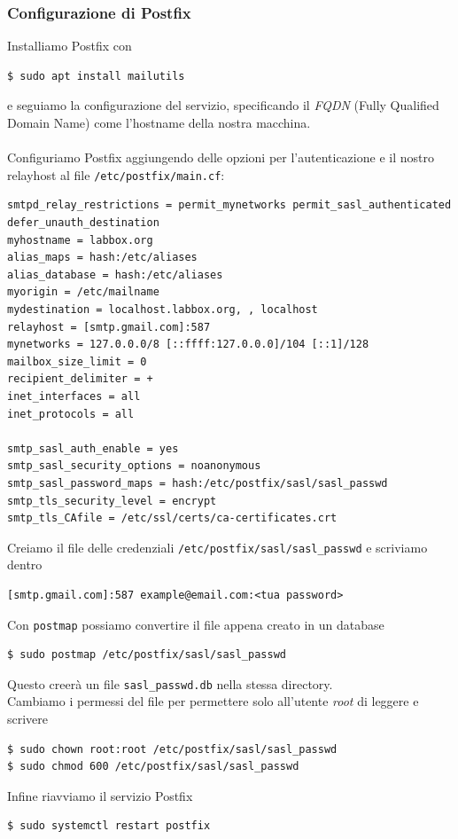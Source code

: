 \documentclass[11pt]{article}
\begin{document}
\subsubsection{Configurazione di Postfix}
Installiamo Postfix con
\begin{verbatim}
$ sudo apt install mailutils
\end{verbatim}
e seguiamo la configurazione del servizio, specificando il \textit{FQDN} (Fully Qualified Domain Name) come l'hostname della nostra macchina.
\\
\\
Configuriamo Postfix aggiungendo delle opzioni per l'autenticazione e il nostro relayhost al file \texttt{/etc/postfix/main.cf}:
\begin{lstlisting}[caption={main.cf}]
smtpd_relay_restrictions = permit_mynetworks permit_sasl_authenticated defer_unauth_destination
myhostname = labbox.org
alias_maps = hash:/etc/aliases
alias_database = hash:/etc/aliases
myorigin = /etc/mailname
mydestination = localhost.labbox.org, , localhost
relayhost = [smtp.gmail.com]:587
mynetworks = 127.0.0.0/8 [::ffff:127.0.0.0]/104 [::1]/128
mailbox_size_limit = 0
recipient_delimiter = +
inet_interfaces = all
inet_protocols = all
    
smtp_sasl_auth_enable = yes
smtp_sasl_security_options = noanonymous
smtp_sasl_password_maps = hash:/etc/postfix/sasl/sasl_passwd
smtp_tls_security_level = encrypt
smtp_tls_CAfile = /etc/ssl/certs/ca-certificates.crt
\end{lstlisting}
Creiamo il file delle credenziali \texttt{/etc/postfix/sasl/sasl\_passwd} e scriviamo dentro
\begin{verbatim}
[smtp.gmail.com]:587 example@email.com:<tua password>
\end{verbatim}
Con \texttt{postmap} possiamo convertire il file appena creato in un database
\begin{verbatim}
$ sudo postmap /etc/postfix/sasl/sasl_passwd
\end{verbatim}
Questo creerà un file \texttt{sasl\_passwd.db} nella stessa directory.
\\
Cambiamo i permessi del file per permettere solo all'utente \textit{root} di leggere e scrivere
\begin{verbatim}
$ sudo chown root:root /etc/postfix/sasl/sasl_passwd
$ sudo chmod 600 /etc/postfix/sasl/sasl_passwd
\end{verbatim}
Infine riavviamo il servizio Postfix
\begin{verbatim}
$ sudo systemctl restart postfix
\end{verbatim}
\end{document}
